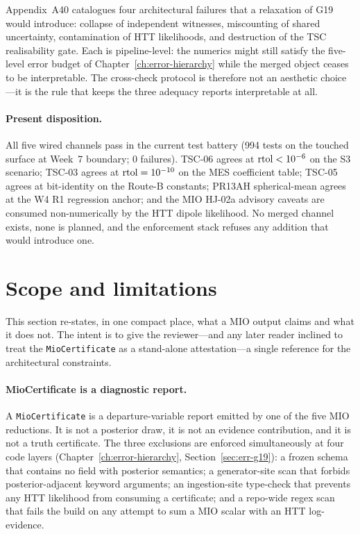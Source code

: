 Appendix~A40 catalogues four architectural failures that a
relaxation of G19 would introduce: collapse of independent
witnesses, miscounting of shared uncertainty, contamination
of HTT likelihoods, and destruction of the TSC
realisability gate.  Each is pipeline-level: the numerics
might still satisfy the five-level error budget of
Chapter~\ref{ch:error-hierarchy} while the merged object
ceases to be interpretable.  The cross-check protocol is
therefore not an aesthetic choice---it is the rule that
keeps the three adequacy reports interpretable at all.

\paragraph{Present disposition.}

All five wired channels pass in the current test battery
(994 tests on the touched surface at Week~7 boundary; 0
failures).  TSC-06 agrees at ${\rm rtol} < 10^{-6}$ on the
S3 scenario; TSC-03 agrees at ${\rm rtol} = 10^{-10}$ on
the MES coefficient table; TSC-05 agrees at bit-identity
on the Route-B constants; PR13AH spherical-mean agrees at
the W4 R1 regression anchor; and the MIO HJ-02a advisory
caveats are consumed non-numerically by the HTT dipole
likelihood.  No merged channel exists, none is planned,
and the enforcement stack refuses any addition that would
introduce one.


\section{Scope and limitations}
\label{sec:mio-scope}

This section re-states, in one compact place, what a MIO
output claims and what it does not.  The intent is to give
the reviewer---and any later reader inclined to treat the
\texttt{MioCertificate} as a stand-alone attestation---a
single reference for the architectural constraints.

\paragraph{MioCertificate is a diagnostic report.}

A \texttt{MioCertificate} is a departure-variable report
emitted by one of the five MIO reductions.  It is not a
posterior draw, it is not an evidence contribution, and it
is not a truth certificate.  The three exclusions are
enforced simultaneously at four code layers
(Chapter~\ref{ch:error-hierarchy}, Section~\ref{sec:err-g19}):
a frozen schema that contains no field with posterior
semantics; a generator-site scan that forbids
posterior-adjacent keyword arguments; an ingestion-site
type-check that prevents any HTT likelihood from consuming
a certificate; and a repo-wide regex scan that fails the
build on any attempt to sum a MIO scalar with an HTT
log-evidence.

